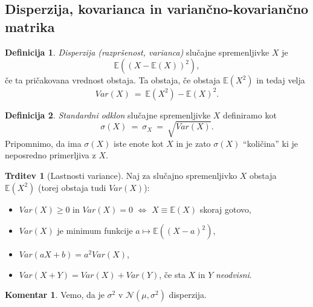 \documentclass[11pt]{article}
\newcommand{\E}{\mathbb{E}}
\newcommand{\1}{\mathbbm{1}}
\newcommand{\n}{\mathcal{N}}
\theoremstyle{definition}
\newtheorem{definicija}{Definicija}[section]
\theoremstyle{definition}
\newtheorem{trditev}{Trditev}[section]
\theoremstyle{definition}
\newtheorem*{komentar}{Komentar}
\begin{document}

\subsection{Disperzija, kovarianca in variančno-kovariančno matrika}
\vspace{0.5cm}

\begin{definicija}

\textit{Disperzija (razpršenost, varianca)} slučajne spremenljivke $X$ je 
$$\E((X - \E(X))^2),$$
če ta pričakovana vrednost obstaja. Ta obstaja, če obstaja $\E(X^2)$ in tedaj velja
$$Var(X) ~=~ \E(X^2) - \E(X)^2.$$

\end{definicija}
\vspace{0.5cm}

\begin{definicija}

\textit{Standardni odklon} slučajne spremenljivke $X$ definiramo kot
$$\sigma(X) ~=~ \sigma_X ~=~ \sqrt{Var(X)}.$$
Pripomnimo, da ima $\sigma(X)$ iste enote kot $X$ in je zato $\sigma(X)$ ``količina'' ki je neposredno primerljiva z $X$.

\end{definicija}
\vspace{0.5cm}

\begin{trditev}[Lastnosti variance]

Naj za slučajno spremenljivko $X$ obstaja $\E(X^2)$ (torej obstaja tudi $Var(X)$):
\begin{itemize}
	\item $Var(X) \geq 0$ in $Var(X) = 0$ $\iff$ $X \equiv \E(X)$ skoraj gotovo,
	
	\item $Var(X)$ je minimum funkcije $a \mapsto \E((X-a)^2)$,
	
	\item $Var(aX+b) = a^2 Var(X)$,
	
	\item $Var(X+Y) = Var(X) + Var(Y)$, če sta $X$ in $Y$ \textit{neodvisni}.
\end{itemize}

\end{trditev}
\vspace{0.5cm}

\begin{komentar}

Vemo, da je $\sigma^2$ v $\n(\mu, \sigma^2)$ disperzija.

\end{komentar}
\vspace{0.5cm}
\end{document}
